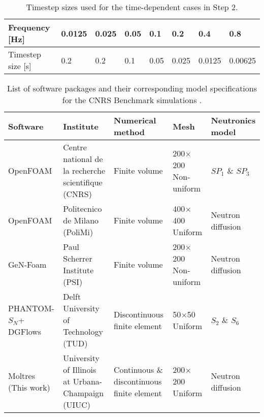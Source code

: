 \begin{table}[tb]
    \caption{Timestep sizes used for the time-dependent cases in
    Step 2.}
    \footnotesize
	\centering
	\setlength\tabcolsep{2.5pt}
	\begin{tabular}{l l l l l l l l}
	    \toprule
	    Frequency [Hz] & 0.0125 & 0.025 & 0.05 & 0.1 & 0.2 & 0.4 & 0.8 \\
	    \midrule
	    Timestep size [s] & 0.2 & 0.2 & 0.1 & 0.05 & 0.025 & 0.0125 & 0.00625
	    \\
	    \bottomrule
	\end{tabular}
	\label{table:timestep}
\end{table}
%
\begin{table*}[tb]
    \caption{List of software packages and their corresponding model
    specifications for the CNRS Benchmark simulations
    \citep{tiberga_results_2020}.}
    \footnotesize
    \centering
    \begin{tabular}{p{2.7cm} p{4cm} p{3cm} p{1.7cm} l}
        \toprule
        Software & Institute & Numerical method & Mesh & Neutronics model \\
        \midrule
        OpenFOAM & Centre national de la recherche scientifique (CNRS) & Finite volume & 200$\times$200 \newline Non-uniform & $SP_1$ \& $SP_3$ \\
        OpenFOAM & Politecnico de Milano (PoliMi) & Finite volume & 400$\times$400 \newline Uniform & Neutron diffusion \\
        GeN-Foam & Paul Scherrer Institute (PSI) & Finite volume & 200$\times$200 \newline Non-uniform & Neutron diffusion \\
        PHANTOM-$S_N$+ \newline DGFlows & Delft University of Technology (TUD) & Discontinuous finite \newline element & 50$\times$50 \newline Uniform & $S_2$ \& $S_6$ \\
        Moltres (This work) & University of Illinois at Urbana-Champaign (UIUC) & Continuous \& discontinuous finite element & 200$\times$200 \newline Uniform & Neutron diffusion \\
        \bottomrule
    \end{tabular}
    \label{table:software}
\end{table*}

\FloatBarrier